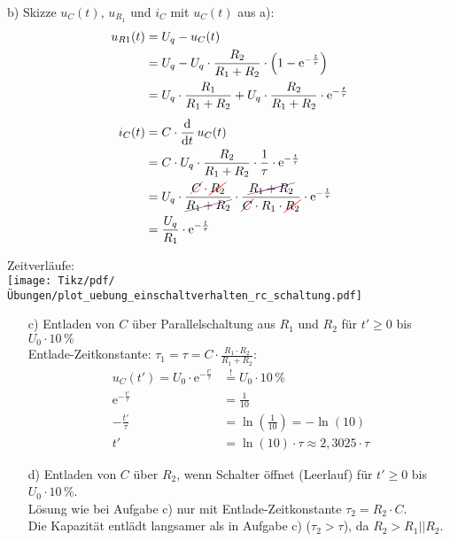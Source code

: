 {\begin{minipage}[t]{0.48\textwidth}
    b) %
    Skizze $u_C(t)$, $u_{R_1}$ und $i_C$ mit $u_C(t)$ aus a):
    \begin{align*}
        u_{R1}(t) &= U_q - u_C(t) \\
            &= U_q - U_q \cdot \frac{R_2}{R_1+R_2} \cdot \left( 1 - \mathrm{e}^{-\frac{t}{\tau}} \right) \\
            &= U_q \cdot \frac{R_1}{R_1+R_2} + U_q \cdot \frac{R_2}{R_1+R_2} \cdot \mathrm{e}^{-\frac{t}{\tau}} \\[4pt]
        i_C(t) &= C \cdot \dt\, u_C(t) \\
            &= C \cdot U_q \cdot \frac{R_2}{R_1+R_2} \cdot \frac{1}{\tau} \cdot \mathrm{e}^{-\frac{t}{\tau}} \\
            &= U_q \cdot \frac{\colorcancel{C}{purple} \cdot \redcancel{R_2}}{\colorcancel{R_1+R_2}{violet}} \cdot \frac{\colorcancel{R_1+R_2}{violet}}{\colorcancel{C}{purple} \cdot R_1 \cdot \redcancel{R_2}}  \cdot \mathrm{e}^{-\frac{t}{\tau}}\\
            &= \frac{U_q}{R_1} \cdot \mathrm{e}^{-\frac{t}{\tau}}
    \end{align*}
\end{minipage}%
\begin{minipage}[t]{0.48\textwidth}\centering
    Zeitverläufe:\\
    \texttt{[image: Tikz/pdf/Übungen/plot\_uebung\_einschaltverhalten\_rc\_schaltung.pdf]}%
\end{minipage}
\begin{itemize}
\item[c)] Entladen von $C$ über Parallelschaltung aus $R_1$ und $R_2$ für $t'\geq0$ bis $U_0 \cdot 10\,\%$ \\
Entlade-Zeitkonstante: $\tau_1= \tau = C \cdot \frac{R_1 \cdot R_2}{R_1+R_2}$:
\begin{align*}
    u_C(t') = U_0 \cdot \mathrm{e}^{-\frac{t'}{\tau}} &\overset{!}{=} U_0 \cdot 10\,\% \\
    \mathrm{e}^{-\frac{t'}{\tau}} &= \frac{1}{10} \\
    -\frac{t'}{\tau} &= \ln\left(\frac{1}{10}\right) = -\ln\left(10\right) \\
    t' &= \ln\left(10\right) \cdot \tau \approx 2,3025 \cdot \tau
\end{align*}
\item[d)] Entladen von $C$ über $R_2$, wenn Schalter öffnet (Leerlauf) für $t'\geq0$ bis $U_0 \cdot 10\,\%$.\\
Lösung wie bei Aufgabe c) nur mit Entlade-Zeitkonstante $\tau_2 = R_2 \cdot C$. \\
Die Kapazität entlädt langsamer als in Aufgabe c) ($\tau_2 > \tau$), da $R_2 > R_1||R_2$.
\end{itemize}
}

